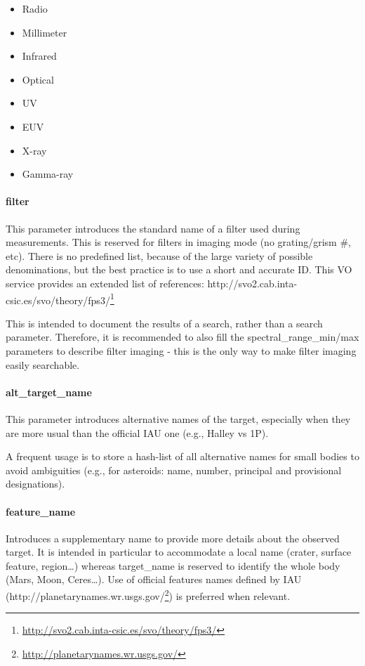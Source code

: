 \documentclass[11pt,a4paper]{ivoa}
\begin{document}
\begin{itemize}
\item Radio
\item Millimeter
\item Infrared
\item Optical
\item UV
\item EUV
\item X-ray
\item Gamma-ray
\end{itemize}

\paragraph{filter}

This parameter introduces the standard name of a filter used during measurements. This is reserved for filters in imaging mode (no grating/grism \#, etc). There is no predefined list, because of the large variety of possible denominations, but the best practice is to use a short and accurate ID. This VO service provides an extended list of references: http://svo2.cab.inta-csic.es/svo/theory/fps3/\footnote{\url{http://svo2.cab.inta-csic.es/svo/theory/fps3/}}

This is intended to document the results of a search, rather than a search parameter. Therefore, it is recommended to also fill the spectral\_range\_min/max parameters to describe filter imaging - this is the only way to make filter imaging easily searchable.

\paragraph{alt\_target\_name}

This parameter introduces alternative names of the target, especially when they are more usual than the official IAU one (e.g., Halley vs 1P).

A frequent usage is to store a hash-list of all alternative names for small bodies to avoid ambiguities (e.g., for asteroids: name, number, principal and provisional designations).

\paragraph{feature\_name}

Introduces a supplementary name to provide more details about the observed target. It is intended in particular to accommodate a local name (crater, surface feature, region…) whereas target\_name is reserved to identify the whole body (Mars, Moon, Ceres…). Use of official features names defined by IAU (http://planetarynames.wr.usgs.gov/\footnote{\url{http://planetarynames.wr.usgs.gov/}}) is preferred when relevant.
\end{document}
